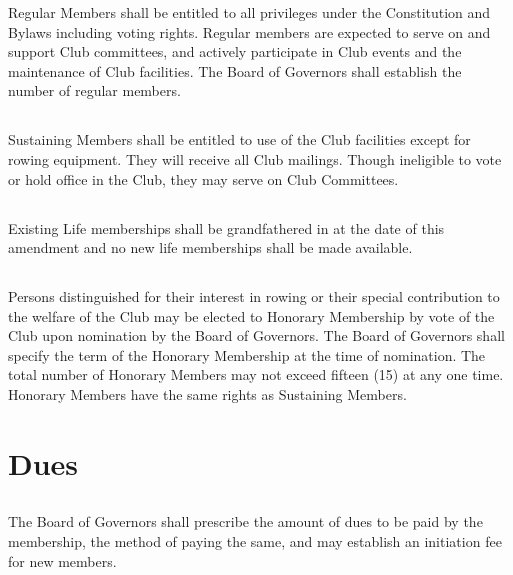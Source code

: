 \documentclass[11pt,american,letterpaper,]{constitution}
\begin{document}
Regular Members shall be entitled to all privileges under the Constitution and Bylaws including voting rights. Regular members are expected to serve on and support Club committees, and actively participate in Club events and the maintenance of Club facilities. The Board of Governors shall establish the number of regular members.

\subsection[Sustaining Members]{} 

Sustaining Members shall be entitled to use of the Club facilities except for rowing equipment. They will receive all Club mailings. Though ineligible to vote or hold office in the Club, they may serve on Club Committees.

\subsection[Life Members]{} 

Existing Life memberships shall be grandfathered in at the date of this amendment and no new life memberships shall be made available.

\subsection[Honorary Members]{} 

Persons distinguished for their interest in rowing or their special contribution to the welfare of the Club may be elected to Honorary Membership by vote of the Club upon nomination by the Board of Governors. The Board of Governors shall specify the term of the Honorary Membership at the time of nomination. The total number of  Honorary Members may not exceed fifteen (15) at any one time. Honorary Members have the same rights as Sustaining Members.

\section{Dues}

\subsection[Prescription]{} 

The Board of Governors shall prescribe the amount of dues to be paid by the membership, the method of paying the same, and may establish an initiation fee for new members.
\end{document}
